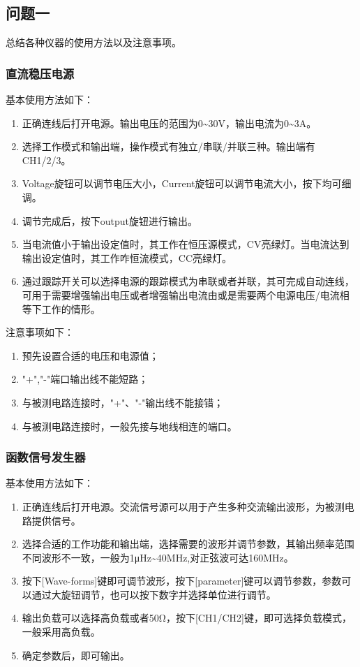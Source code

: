 \documentclass[a4paper,11pt,UTF8]{ctexart}
\begin{document}
\subsection{问题一}
总结各种仪器的使用方法以及注意事项。
\subsubsection{直流稳压电源}
基本使用方法如下：
\begin{enumerate}
  \item 正确连线后打开电源。输出电压的范围为0\~{}30V，输出电流为0\~{}3A。
  \item 选择工作模式和输出端，操作模式有独立/串联/并联三种。输出端有CH1/2/3。
  \item Voltage旋钮可以调节电压大小，Current旋钮可以调节电流大小，按下均可细调。
  \item 调节完成后，按下output旋钮进行输出。
  \item 当电流值小于输出设定值时，其工作在恒压源模式，CV亮绿灯。当电流达到输出设定值时，其工作咋恒流模式，CC亮绿灯。
  \item 通过跟踪开关可以选择电源的跟踪模式为串联或者并联，其可完成自动连线，可用于需要增强输出电压或者增强输出电流由或是需要两个电源电压/电流相等下工作的情形。
\end{enumerate}

注意事项如下：
\begin{enumerate}
  \item 预先设置合适的电压和电源值；
  \item "+","-"端口输出线不能短路；
  \item 与被测电路连接时，"+"、"-"输出线不能接错；
  \item 与被测电路连接时，一般先接与地线相连的端口。
\end{enumerate}
\subsubsection{函数信号发生器}
基本使用方法如下：
\begin{enumerate}
  \item 正确连线后打开电源。交流信号源可以用于产生多种交流输出波形，为被测电路提供信号。
  \item 选择合适的工作功能和输出端，选择需要的波形并调节参数，其输出频率范围不同波形不一致，一般为1μHz\~{}40MHz,对正弦波可达160MHz。
  \item 按下[Wave-forms]键即可调节波形，按下[parameter]键可以调节参数，参数可以通过大旋钮调节，也可以按下数字并选择单位进行调节。
  \item 输出负载可以选择高负载或者50Ω，按下[CH1/CH2]键，即可选择负载模式，一般采用高负载。
  \item 确定参数后，即可输出。
\end{enumerate}
\end{document}

